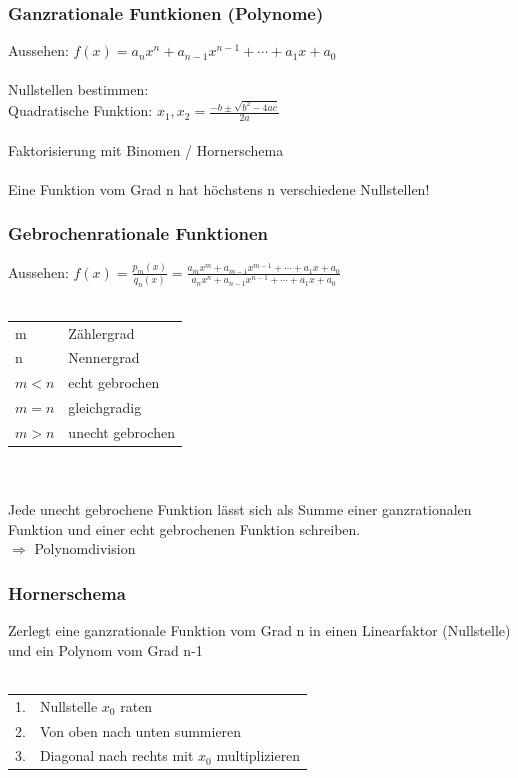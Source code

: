 			
			\subsubsection{Ganzrationale Funtkionen (Polynome)}

			Aussehen: $f(x)=a_nx^{n}+a_{n-1}x^{n-1}+\cdots+a_1x+a_0$\\
			\\
			Nullstellen bestimmen:
			\\
			Quadratische Funktion: $x_1 , x_2 = \frac{-b \pm \sqrt{b^2 - 4ac}}{2a}$ \\
			\\
			Faktorisierung mit Binomen / Hornerschema \\
			\\
			Eine Funktion vom Grad n hat höchstens n verschiedene Nullstellen!
			
			
			\subsubsection{Gebrochenrationale Funktionen}
			Aussehen: $f(x)=\frac{p_m(x)}{q_n(x)}=\frac{a_mx^{m}+a_{m-1}x^{m-1}+\cdots+a_1x+a_0}{a_nx^{n}+a_{n-1}x^{n-1}+\cdots+a_1x+a_0}$ \\
			\\
			\begin{tabular}{ll} 
				m & Zählergrad \\
				n & Nennergrad \\
				$m < n$ & echt gebrochen \\
				$m = n$ & gleichgradig \\
				$m > n$ & unecht gebrochen\\ 
			\end{tabular}	
			\\
			\\ Jede unecht gebrochene Funktion lässt sich als Summe einer ganzrationalen Funktion und einer echt gebrochenen Funktion schreiben. \\
			$\Rightarrow$ Polynomdivision \\
			
            \columnbreak
			
			\subsubsection{Hornerschema}
			Zerlegt eine ganzrationale Funktion vom Grad n in einen Linearfaktor (Nullstelle) und ein Polynom vom Grad n-1 \\
			\\
			\begin{tabular}{ll}
			1. & Nullstelle $x_0$ raten \\
			2. & Von oben nach unten summieren \\
			3. & Diagonal nach rechts mit $x_0$ multiplizieren
			\end{tabular}	
			
